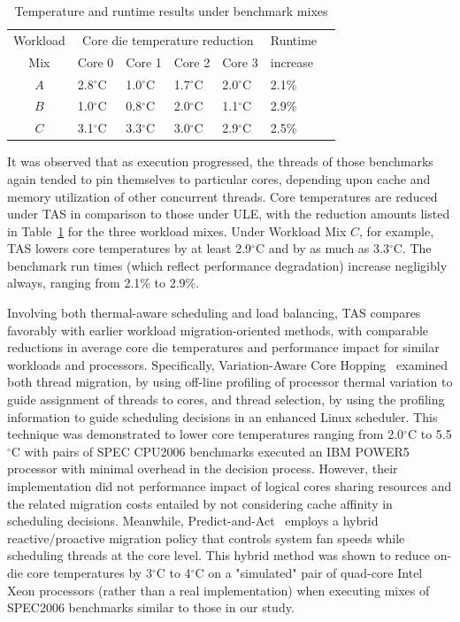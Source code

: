 \documentclass[times, 10pt,twocolumn]{IEEEtran}
\begin{document}
\begin{table}[tbp] 
\centering
\caption{Temperature and runtime results under benchmark mixes}
\label{tab:mixwkload}
\begin{tabular}{cllllll} 
\hline
\hline
Workload & \multicolumn{4}{c}{Core die temperature reduction} & Runtime\\
 Mix & Core 0 & Core 1 & Core 2  & Core 3 & increase \\
\hline
$A$ & 2.8$^{\circ}$C & 1.0$^{\circ}$C & 1.7$^{\circ}$C & 2.0$^{\circ}$C & 2.1\% \\
$B$ & 1.0$^{\circ}$C & 0.8$^{\circ}$C & 2.0$^{\circ}$C & 1.1$^{\circ}$C & 2.9\% \\
$C$ & 3.1$^{\circ}$C & 3.3$^{\circ}$C & 3.0$^{\circ}$C & 2.9$^{\circ}$C & 2.5\% \\
\hline
\end{tabular}
\end{table}

It was observed that as execution progressed, the threads of those
benchmarks again tended to pin themselves to particular cores, depending
upon cache and memory utilization of other concurrent threads.  Core
temperatures are reduced under TAS in comparison to those under ULE,
with the reduction amounts listed in Table~\ref{tab:mixwkload} for the
three workload mixes.  Under Workload Mix $C$, for example, TAS lowers
core temperatures by at least 2.9$^{\circ}$C and by as much as
3.3$^{\circ}$C.  The benchmark run times (which reflect performance
degradation) increase negligibly always, ranging from 2.1\% to 2.9\%.

Involving both thermal-aware scheduling and load balancing, TAS compares
favorably with earlier workload migration-oriented methods, with
comparable reductions in average core die temperatures and performance
impact for similar workloads and processors.  Specifically,
Variation-Aware Core Hopping~\cite{Kursun2009} examined both thread
migration, by using off-line profiling of processor thermal variation to
guide assignment of threads to cores, and thread selection, by using the
profiling information to guide scheduling decisions in an enhanced Linux
scheduler.  This technique was demonstrated to lower core temperatures
ranging from 2.0$^{\circ}$C to 5.5$^{\circ}$C with pairs of SPEC CPU2006
benchmarks executed an IBM POWER5 processor with minimal overhead in the
decision process. However, their implementation did not performance
impact of logical cores sharing resources and the related
migration costs entailed by not considering cache affinity in scheduling
decisions.  Meanwhile, Predict-and-Act~\cite{Ayoub2011}
employs a hybrid reactive/proactive migration policy that controls
system fan speeds while scheduling threads at the core level.  This
hybrid method  was shown
to reduce on-die core temperatures by 3$^{\circ}$C to 4$^{\circ}$C on a
"simulated" pair of quad-core Intel Xeon processors (rather than a real
implementation) when executing mixes of SPEC2006 benchmarks similar to
those in our study.
\end{document}
